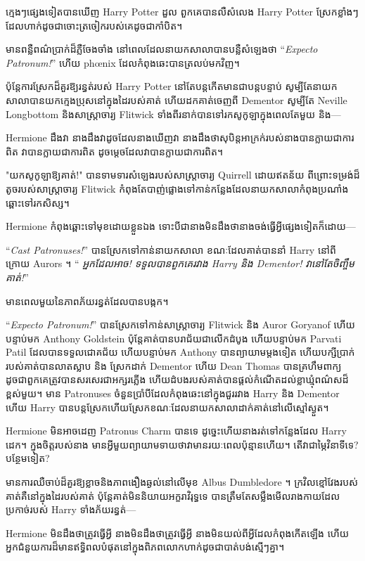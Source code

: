 \later

ក្មេងៗផ្សេងទៀតបានឃើញ Harry Potter ដួល ពួកគេបានលឺសំលេង Harry Potter ស្រែកខ្លាំងៗ ដែលហាក់ដូចជាចោះត្រចៀករបស់គេដូចជាកាំបិត។

មានពន្លឺពណ៌ប្រាក់ដ៏ភ្លឺចែងចាំង នៅពេលដែលនាយកសាលាបានបន្លឺសំឡេងថា “\emph{Expecto Patronum!}” ហើយ phœnix ដែលកំពុងឆេះបានត្រលប់មកវិញ។

ប៉ុន្តែការស្រែកដ៏គួរឱ្យរន្ធត់របស់ Harry Potter នៅតែបន្តកើតមានជាបន្តបន្ទាប់ សូម្បីតែនាយកសាលាបានយកក្មេងប្រុសនៅក្នុងដៃរបស់គាត់ ហើយដកគាត់ចេញពី Dementor សូម្បីតែ Neville Longbottom និងសាស្រ្តាចារ្យ Flitwick ទាំងពីរនាក់បានទៅរកសូកូឡាក្នុងពេលតែមួយ និង—

Hermione ដឹងវា នាងដឹងវាដូចដែលនាងឃើញវា នាងដឹងថាសុបិន្តអាក្រក់របស់នាងបានក្លាយជាការពិត វាបានក្លាយជាការពិត ដូចម្ដេចដែលវាបានក្លាយជាការពិត។

"យកសូកូឡាឱ្យគាត់!" បានទាមទារសំឡេងរបស់សាស្រ្តាចារ្យ Quirrell ដោយឥតន័យ ពីព្រោះទម្រង់ដ៏តូចរបស់សាស្រ្តាចារ្យ Flitwick កំពុងតែបាញ់ផ្លោងទៅកាន់កន្លែងដែលនាយកសាលាកំពុងប្រណាំងឆ្ពោះទៅរកសិស្ស។

Hermione កំពុងឆ្ពោះទៅមុខដោយខ្លួនឯង ទោះបីជានាងមិនដឹងថានាងចង់ធ្វើអ្វីផ្សេងទៀតក៏ដោយ—

“\emph{Cast Patronuses!}” បានស្រែកទៅកាន់នាយកសាលា ខណៈដែលគាត់បាននាំ Harry នៅពីក្រោយ Aurors ។ “\emph{ អ្នក​ដែល​អាច! ទទួលបានពួកគេរវាង Harry និង Dementor! វានៅតែចិញ្ចឹមគាត់!}”

មាន​ពេល​មួយ​នៃ​ភាព​ភ័យ​រន្ធត់​ដែល​បាន​បង្កក​។

“\emph{Expecto Patronum!}” បានស្រែកទៅកាន់សាស្រ្តាចារ្យ Flitwick និង Auror Goryanof ហើយបន្ទាប់មក Anthony Goldstein ប៉ុន្តែគាត់បានបរាជ័យជាលើកដំបូង ហើយបន្ទាប់មក Parvati Patil ដែលបានទទួលជោគជ័យ ហើយបន្ទាប់មក Anthony បានព្យាយាមម្តងទៀត ហើយបក្សីប្រាក់របស់គាត់បានលាតស្លាប និង ស្រែកដាក់ Dementor ហើយ Dean Thomas បានគ្រហឹមពាក្យដូចជាពួកគេត្រូវបានសរសេរជាអក្សរភ្លើង ហើយដំបងរបស់គាត់បានផ្តល់កំណើតដល់ខ្លាឃ្មុំពណ៌សដ៏ខ្ពស់មួយ។ មាន Patronuses ចំនួនប្រាំបីដែលកំពុងឆេះនៅក្នុងជួររវាង Harry និង Dementor ហើយ Harry បានបន្តស្រែកហើយស្រែកខណៈដែលនាយកសាលាដាក់គាត់នៅលើស្មៅស្ងួត។

Hermione មិនអាចដេញ Patronus Charm បានទេ ដូច្នេះហើយនាងរត់ទៅកន្លែងដែល Harry ដេក។ ក្នុង​ចិត្ត​របស់​នាង មាន​អ្វី​មួយ​ព្យាយាម​ទាយ​ថា​វា​មាន​រយៈពេល​ប៉ុន្មាន​ហើយ។ តើវាជាម្ភៃវិនាទីទេ? បន្ថែមទៀត?

មាន​ការ​ឈឺ​ចាប់​ដ៏​គួរ​ឱ្យ​ខ្លាច​និង​ភាព​ងឿង​ឆ្ងល់​នៅ​លើ​មុខ Albus Dumbledore ។ ក្រវិលខ្មៅវែងរបស់គាត់គឺនៅក្នុងដៃរបស់គាត់ ប៉ុន្តែគាត់មិននិយាយអក្ខរាវិរុទ្ធទេ បានត្រឹមតែសម្លឹងមើលរាងកាយដែលប្រកាច់របស់ Harry ទាំងភ័យរន្ធត់—

Hermione មិនដឹងថាត្រូវធ្វើអ្វី នាងមិនដឹងថាត្រូវធ្វើអ្វី នាងមិនយល់ពីអ្វីដែលកំពុងកើតឡើង ហើយអ្នកជំនួយការដ៏មានឥទ្ធិពលបំផុតនៅក្នុងពិភពលោកហាក់ដូចជាបាត់បង់ស្មើៗគ្នា។

